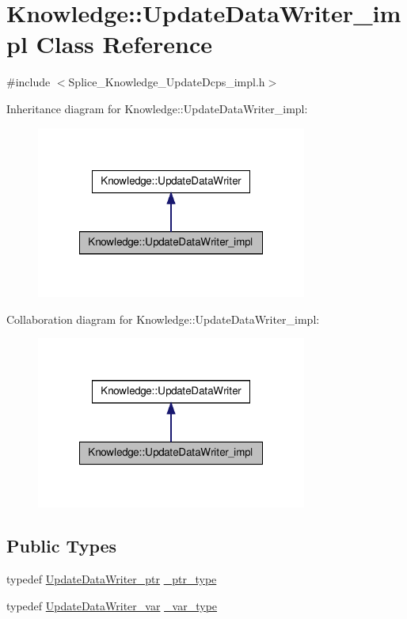 \hypertarget{classKnowledge_1_1UpdateDataWriter__impl}{
\section{Knowledge::UpdateDataWriter\_\-impl Class Reference}
\label{d2/d2e/classKnowledge_1_1UpdateDataWriter__impl}
}


{\ttfamily \#include $<$Splice\_\-Knowledge\_\-UpdateDcps\_\-impl.h$>$}



Inheritance diagram for Knowledge::UpdateDataWriter\_\-impl:
\nopagebreak
\begin{figure}[H]
\begin{center}
\leavevmode
\includegraphics[width=252pt]{d9/d2e/classKnowledge_1_1UpdateDataWriter__impl__inherit__graph}
\end{center}
\end{figure}


Collaboration diagram for Knowledge::UpdateDataWriter\_\-impl:
\nopagebreak
\begin{figure}[H]
\begin{center}
\leavevmode
\includegraphics[width=252pt]{d1/d5e/classKnowledge_1_1UpdateDataWriter__impl__coll__graph}
\end{center}
\end{figure}
\subsection*{Public Types}
\begin{DoxyCompactItemize}
\item 
typedef \hyperlink{classKnowledge_1_1UpdateDataWriter}{UpdateDataWriter\_\-ptr} \hyperlink{classKnowledge_1_1UpdateDataWriter_aa60c888db648c0f608ef197ead80c9a6}{\_\-ptr\_\-type}
\item 
typedef \hyperlink{namespaceKnowledge_a560a08cffb536bdec78ec681bd76c4b5}{UpdateDataWriter\_\-var} \hyperlink{classKnowledge_1_1UpdateDataWriter_a61f476a3f203c6b39a1995c70cf47526}{\_\-var\_\-type}
\end{DoxyCompactItemize}
